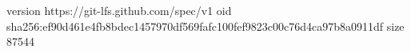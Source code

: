 version https://git-lfs.github.com/spec/v1
oid sha256:ef90d461e4fb8bdec1457970df569fafc100fef9823c00c76d4ca97b8a0911df
size 87544
